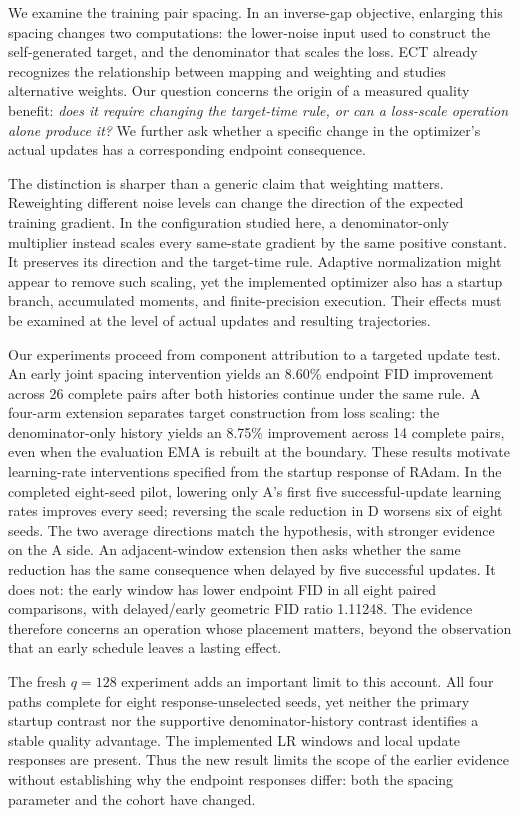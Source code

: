 We examine the training pair spacing. In an inverse-gap objective, enlarging this spacing changes two computations: the lower-noise input used to construct the self-generated target, and the denominator that scales the loss. ECT already recognizes the relationship between mapping and weighting and studies alternative weights. Our question concerns the origin of a measured quality benefit: \emph{does it require changing the target-time rule, or can a loss-scale operation alone produce it?} We further ask whether a specific change in the optimizer's actual updates has a corresponding endpoint consequence.

The distinction is sharper than a generic claim that weighting matters. Reweighting different noise levels can change the direction of the expected training gradient. In the configuration studied here, a denominator-only multiplier instead scales every same-state gradient by the same positive constant. It preserves its direction and the target-time rule. Adaptive normalization might appear to remove such scaling, yet the implemented optimizer also has a startup branch, accumulated moments, and finite-precision execution. Their effects must be examined at the level of actual updates and resulting trajectories.

Our experiments proceed from component attribution to a targeted update test. An early joint spacing intervention yields an 8.60\% endpoint FID improvement across 26 complete pairs after both histories continue under the same rule. A four-arm extension separates target construction from loss scaling: the denominator-only history yields an 8.75\% improvement across 14 complete pairs, even when the evaluation EMA is rebuilt at the boundary. These results motivate learning-rate interventions specified from the startup response of RAdam. In the completed eight-seed pilot, lowering only A's first five successful-update learning rates improves every seed; reversing the scale reduction in D worsens six of eight seeds. The two average directions match the hypothesis, with stronger evidence on the A side. An adjacent-window extension then asks whether the same reduction has the same consequence when delayed by five successful updates. It does not: the early window has lower endpoint FID in all eight paired comparisons, with delayed/early geometric FID ratio 1.11248. The evidence therefore concerns an operation whose placement matters, beyond the observation that an early schedule leaves a lasting effect.

The fresh $q=128$ experiment adds an important limit to this account. All four paths complete for eight response-unselected seeds, yet neither the primary startup contrast nor the supportive denominator-history contrast identifies a stable quality advantage. The implemented LR windows and local update responses are present. Thus the new result limits the scope of the earlier evidence without establishing why the endpoint responses differ: both the spacing parameter and the cohort have changed.

